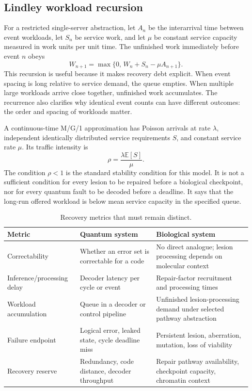 \documentclass[11pt,a4paper,oneside]{article}
\newcommand{\E}{\mathbb{E}}\newcommand{\Pp}{\mathbb{P}}\newcommand{\R}{\mathbb{R}}\newcommand{\N}{\mathbb{N}}\newcommand{\cX}{\mathcal{X}}\newcommand{\cE}{\mathcal{E}}\newcommand{\cF}{\mathcal{F}}\newcommand{\cS}{\mathcal{S}}\newcommand{\cD}{\mathcal{D}}\newcommand{\cR}{\mathcal{R}}\newcommand{\cC}{\mathcal{C}}\newcommand{\cL}{\mathcal{L}}\newcommand{\cN}{\mathcal{N}}\newcommand{\dd}{\,\mathrm{d}}\newcommand{\Prob}{\mathrm{Pr}}\newcommand{\Var}{\mathrm{Var}}\newcommand{\Cov}{\mathrm{Cov}}\newcommand{\diag}{\mathrm{diag}}\newcommand{\tr}{\mathrm{tr}}\newcommand{\argmin}{\operatorname*{arg\,min}}\newcommand{\argmax}{\operatorname*{arg\,max}}
\begin{document}
\subsection{Lindley workload recursion}
For a restricted single-server abstraction, let \(A_n\) be the interarrival time between event workloads, let \(S_n\) be service work, and let \(\mu\) be constant service capacity measured in work units per unit time. The unfinished work immediately before event \(n\) obeys
\begin{equation}\label{eq:lindley}
W_{n+1}=\max\{0,\,W_n+S_n-\mu A_{n+1}\}.
\end{equation}
This recursion is useful because it makes recovery debt explicit. When event spacing is long relative to service demand, the queue empties. When multiple large workloads arrive close together, unfinished work accumulates. The recurrence also clarifies why identical event counts can have different outcomes: the order and spacing of workloads matter.

A continuous-time M/G/1 approximation has Poisson arrivals at rate \(\lambda\), independent identically distributed service requirements \(S\), and constant service rate \(\mu\). Its traffic intensity is
\begin{equation}\label{eq:rho}
\rho=\frac{\lambda\E[S]}{\mu}.
\end{equation}
The condition \(\rho<1\) is the standard stability condition for this model. It is not a sufficient condition for every lesion to be repaired before a biological checkpoint, nor for every quantum fault to be decoded before a deadline. It says that the long-run offered workload is below mean service capacity in the specified queue.

\begin{table}[t]\centering\small\caption{Recovery metrics that must remain distinct.}\label{tab:recovery-metrics}\begin{tabularx}{\linewidth}{p{.23\linewidth}XX}\toprule
Metric & Quantum system & Biological system\\\midrule
Correctability & Whether an error set is correctable for a code & No direct analogue; lesion processing depends on molecular context\\
Inference/processing delay & Decoder latency per cycle or event & Repair-factor recruitment and processing times\\
Workload accumulation & Queue in a decoder or control pipeline & Unfinished lesion-processing demand under selected pathway abstraction\\
Failure endpoint & Logical error, leaked state, cycle deadline miss & Persistent lesion, aberration, mutation, loss of viability\\
Recovery reserve & Redundancy, code distance, decoder throughput & Repair pathway availability, checkpoint capacity, chromatin context\\\bottomrule\end{tabularx}\end{table}
\end{document}
